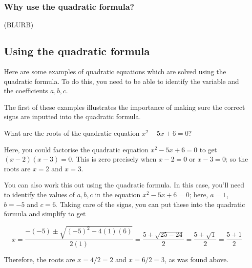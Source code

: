 \documentclass[
  12pt,
  a4paper, oneside]{starmastarticle}
\begin{document}
\hypertarget{why-use-the-quadratic-formula}{%
\subsubsection*{Why use the quadratic
formula?}\label{why-use-the-quadratic-formula}}

(BLURB)

\hypertarget{using-the-quadratic-formula}{%
\subsection*{Using the quadratic
formula}\label{using-the-quadratic-formula}}

Here are some examples of quadratic equations which are solved using the
quadratic formula. To do this, you need to be able to identify the
variable and the coefficients \(a,b,c\).

The first of these examples illustrates the importance of making sure
the correct signs are inputted into the quadratic formula.

\begin{tcolorbox}[enhanced jigsaw, toprule=.15mm, opacityback=0, bottomrule=.15mm, arc=.35mm, left=2mm, rightrule=.15mm, breakable, leftrule=.75mm, colframe=quarto-callout-note-color-frame, colback=white]
\begin{minipage}[t]{5.5mm}
\textcolor{quarto-callout-note-color}{\faInfo}
\end{minipage}%
\begin{minipage}[t]{\textwidth - 5.5mm}
What are the roots of the quadratic equation \(x^2 - 5x + 6 = 0\)?

Here, you could factorise the quadratic equation \(x^2 - 5x + 6 = 0\) to
get \((x-2)(x-3) = 0\). This is zero precisely when \(x - 2 = 0\) or
\(x - 3 = 0\); so the roots are \(x = 2\) and \(x = 3\).

You can also work this out using the quadratic formula. In this case,
you'll need to identify the values of \(a,b,c\) in the equation
\(x^2 - 5x + 6 = 0\); here, \(a = 1\), \(b = -5\) and \(c = 6\). Taking
care of the signs, you can put these into the quadratic formula and
simplify to get

\[ x = \frac{-(-5) \pm \sqrt{(-5)^2 - 4(1)(6)}}{2(1)} = \frac{5 \pm \sqrt{25 - 24}}{2} = \frac{5 \pm \sqrt{1}}{2} = \frac{5\pm 1}{2}\]

Therefore, the roots are \(x = 4/2 = 2\) and \(x = 6/2 = 3\), as was
found above.\end{minipage}%
\end{tcolorbox}
\end{document}
